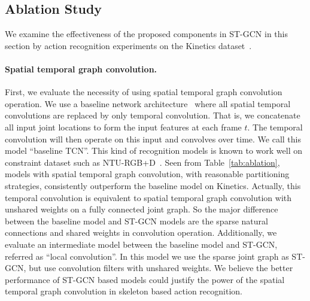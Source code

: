 \documentclass[letterpaper]{article} \usepackage{aaai18}  \usepackage{times}  \usepackage{helvet}  \usepackage{courier}  \usepackage{url}  \usepackage{graphicx}
\begin{document}
\subsection{Ablation Study}\label{sec:ablation}
We examine the effectiveness of the proposed components in ST-GCN in this section by action recognition experiments on the Kinetics dataset~\cite{Kay2017Kinetics}.

\paragraph{Spatial temporal graph convolution.}
First, we evaluate the necessity of using spatial temporal graph convolution operation.
We use a baseline network architecture~\cite{Kim2017CVPRW} where all spatial temporal convolutions are replaced by only temporal convolution. That is, we concatenate all input joint locations to form the input features at each frame $ t $.
The temporal convolution will then operate on this input and convolves over time.
We call this model ``baseline TCN''.
This kind of recognition models is known to work well on constraint dataset such as NTU-RGB+D~\cite{Kim2017CVPRW}.
Seen from Table~\ref{tab:ablation}, models with spatial temporal graph convolution, with reasonable partitioning strategies, consistently outperform the baseline model on Kinetics.
Actually, this temporal convolution is equivalent to spatial temporal graph convolution with unshared weights on a fully connected joint graph.
So the major difference between the baseline model and ST-GCN models are the sparse natural connections and shared weights in convolution operation.
Additionally, we evaluate an intermediate model between the baseline model and ST-GCN, referred as ``local convolution''. 
In this model we use the sparse joint graph as ST-GCN, but use convolution filters with unshared weights.
We believe the better performance of ST-GCN based models could justify the power of the spatial temporal graph convolution in skeleton based action recognition.
\end{document}
